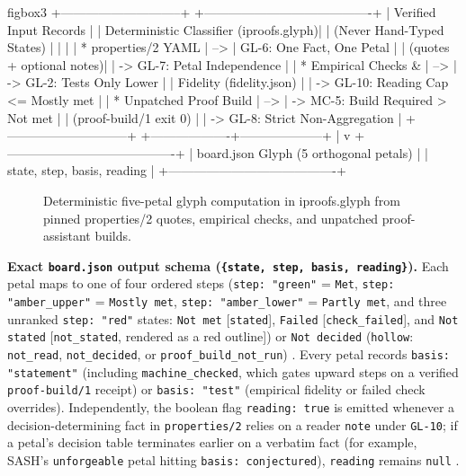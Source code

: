\documentclass[11pt,letterpaper]{article}
\begin{document}
\begin{SaveVerbatim}[fontsize=\scriptsize]{figbox3}
+-----------------------------+     +----------------------------------------+
| Verified Input Records      |     | Deterministic Classifier (iproofs.glyph)|
| (Never Hand-Typed States)   |     |                                        |
|  * properties/2 YAML        | --> |  GL-6: One Fact, One Petal             |
|    (quotes + optional notes)|     |    -> GL-7: Petal Independence         |
|  * Empirical Checks &       | --> |    -> GL-2: Tests Only Lower           |
|    Fidelity (fidelity.json) |     |    -> GL-10: Reading Cap <= Mostly met |
|  * Unpatched Proof Build    | --> |    -> MC-5: Build Required > Not met   |
|    (proof-build/1 exit 0)   |     |    -> GL-8: Strict Non-Aggregation     |
+-----------------------------+     +-------------------+--------------------+
                                                        |
                                                        v
                                    +----------------------------------------+
                                    | board.json Glyph (5 orthogonal petals) |
                                    | {state, step, basis, reading}          |
                                    +----------------------------------------+
\end{SaveVerbatim}
\begin{figure}[htbp]
\centering
\setlength{\fboxsep}{6pt}
\caption{Deterministic five-petal glyph computation in iproofs.glyph from pinned properties/2 quotes, empirical checks, and unpatched proof-assistant builds.}
\label{fig:glyph-pipeline}
\end{figure}

\textbf{Exact \texttt{board.\allowbreak{}json} output schema (\texttt{\{state, step, basis, reading\}}).} Each petal maps to one of four ordered steps (\texttt{step: "green"} = \texttt{Met}, \texttt{step: "amber\_\allowbreak{}upper"} = \texttt{Mostly met}, \texttt{step: "amber\_\allowbreak{}lower"} = \texttt{Partly met}, and three unranked \texttt{step: "red"} states: \texttt{Not met} [\texttt{stated}], \texttt{Failed} [\texttt{check\_\allowbreak{}failed}], and \texttt{Not stated} [\texttt{not\_\allowbreak{}stated}, rendered as a red outline]) or \texttt{Not decided} (\texttt{hollow}: \texttt{not\_\allowbreak{}read}, \texttt{not\_\allowbreak{}decided}, or \texttt{proof\_\allowbreak{}build\_\allowbreak{}not\_\allowbreak{}run}) \cite{iproofs2026}. Every petal records \texttt{basis: "statement"} (including \texttt{machine\_\allowbreak{}checked}, which gates upward steps on a verified \texttt{proof-\allowbreak{}build/\allowbreak{}1} receipt) or \texttt{basis: "test"} (empirical fidelity or failed check overrides). Independently, the boolean flag \texttt{reading: true} is emitted whenever a decision-determining fact in \texttt{properties/\allowbreak{}2} relies on a reader \texttt{note} under \texttt{GL-10}; if a petal's decision table terminates earlier on a verbatim fact (for example, SASH's \texttt{unforgeable} petal hitting \texttt{basis: conjectured}), \texttt{reading} remains \texttt{null} \cite{iproofs2026}.
\end{document}
